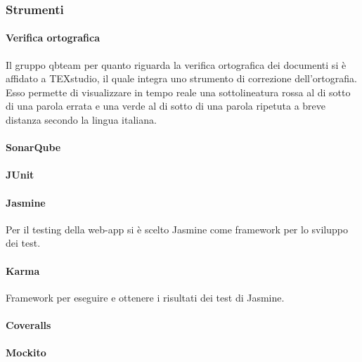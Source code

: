 \subsubsection{Strumenti}

\paragraph{Verifica ortografica}
Il gruppo qbteam per quanto riguarda la verifica ortografica dei documenti si è affidato a TEXstudio, il quale integra uno strumento di correzione dell'ortografia. Esso permette di visualizzare in tempo reale una sottolineatura rossa al di sotto di una parola errata e una verde al di sotto di una parola ripetuta a breve distanza secondo la lingua italiana.  
\paragraph{SonarQube}
\paragraph{JUnit}
\paragraph{Jasmine}
Per il testing della web-app si è scelto Jasmine come framework per lo sviluppo dei test.
\paragraph{Karma}
Framework per eseguire e ottenere i risultati dei test di Jasmine.
\paragraph{Coveralls}
\paragraph{Mockito}